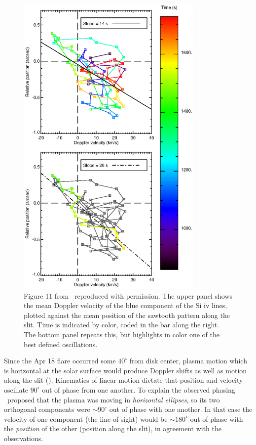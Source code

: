 \begin{figure}[htbp]
\centerline{\includegraphics[height=6.0in]{ParkerLongcope2017/fig11}}
\caption{Figure 11 from \BLQ\ reproduced with permission.  The upper panel shows the mean Doppler velocity of the blue component of the Si {\sc iv} lines, plotted against the mean position of the sawtooth pattern along the slit.  Time is indicated by color, coded in the bar along the right.  The bottom panel repeats this, but highlights in color one of the best defined oscillations.}
	\label{fig:Brannon11}
\end{figure}

Since the Apr 18 flare occurred some $40^{\circ}$ from disk center, plasma motion which is horizontal at the solar surface would produce Doppler shifts as well as motion along the slit (\BLQ).  Kinematics of linear motion dictate that position and velocity oscillate $90^{\circ}$ out of phase from one another.  To explain the observed phasing \BLQ\ proposed that the plasma was moving in {\em horizontal ellipses}, so its two orthogonal components were $\sim90^{\circ}$ out of phase with one another.  In that case the velocity of one component (the line-of-sight) would be $\sim180^{\circ}$ out of phase with the {\em position} of the other (position along the slit), in agreement with the observations.  

